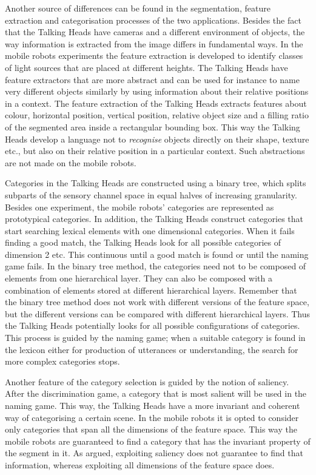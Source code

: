 Another source of differences can be found in the segmentation, feature extraction and categorisation processes of the two applications. Besides the fact that the Talking Heads have cameras and a different environment of objects, the way information is extracted from the image differs in fundamental ways. In the mobile robots experiments the feature extraction is developed to identify classes of light sources that are placed at different heights. The Talking Heads have feature extractors that are more abstract and can be used for instance to name very different objects similarly by using information about their relative positions in a context. The feature extraction of the Talking Heads extracts features about colour, horizontal position, vertical position, relative object size and a filling ratio of the segmented area inside a rectangular bounding box. This way the Talking Heads develop a language not to {\em recognise} objects directly on their shape, texture etc., but also on their relative position in a particular context. Such abstractions are not made on the mobile robots. 

Categories in the Talking Heads are constructed using a binary tree, which splits subparts of the sensory channel space in equal halves of increasing granularity. Besides one experiment, the mobile robots' categories are represented as prototypical categories. In addition, the Talking Heads construct categories that start searching lexical elements with one dimensional categories. When it fails finding a good match, the Talking Heads look for all possible categories of dimension 2 etc. This continuous until a good match is found or until the naming game fails. In the binary tree method, the categories need not to be composed of elements from one hierarchical layer. They can also be composed with a combination of elements stored at different hierarchical layers. Remember that the binary tree method does not work with different versions of the feature space, but the different versions can be compared with different hierarchical layers. Thus the Talking Heads potentially looks for all possible configurations of categories. This process is guided by the naming game; when a suitable category is found in the lexicon either for production of utterances or understanding, the search for more complex categories stops.

Another feature of the category selection is guided by the notion of {\sc saliency}. After the discrimination game, a category that is most salient will be used in the naming game. This way, the Talking Heads have a more invariant and coherent way of categorising a certain scene. In the mobile robots it is opted to consider only categories that span all the dimensions of the feature space. This way the mobile robots are guaranteed to find a category that has the invariant property of the segment in it. As argued, exploiting saliency does not guarantee to find that information, whereas exploiting all dimensions of the feature space does.

